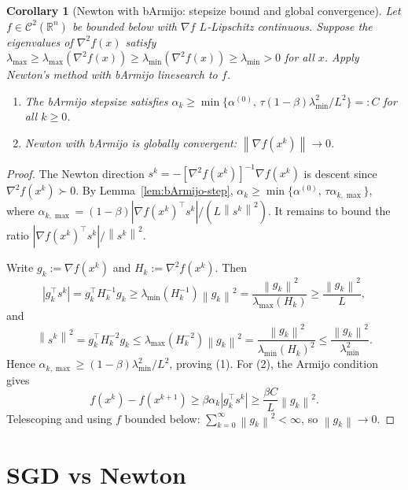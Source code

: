 \documentclass[11pt,a4paper]{report}
\theoremstyle{plain}
\newtheorem{corollary}[theorem]{Corollary}
\theoremstyle{definition}
\newcommand{\R}{\mathbb{R}}
\newcommand{\norm}[1]{\left\lVert#1\right\rVert}
\newcommand{\grad}{\nabla}
\newcommand{\hess}{\nabla^{2}}
\newcommand{\trans}{^{\top}}
\begin{document}
\begin{corollary}[Newton with bArmijo: stepsize bound and global convergence]\label{cor:newton-global}
Let $f\in\mathcal{C}^{2}(\R^{n})$ be bounded below with $\grad f$ $L$-Lipschitz continuous. Suppose the eigenvalues of $\hess f(x)$ satisfy
$\lambda_{\max}\ge\lambda_{\max}(\hess f(x))\ge\lambda_{\min}(\hess f(x))\ge\lambda_{\min}>0$
for all $x$. Apply Newton's method with bArmijo linesearch to $f$.
\begin{enumerate}[leftmargin=2em,itemsep=0pt]
  \item The bArmijo stepsize satisfies
        $\alpha_{k}\ge\min\bigl\{\alpha^{(0)},\,\tau(1-\beta)\lambda_{\min}^{2}/L^{2}\bigr\}=:C$
        for all $k\ge 0$.
  \item Newton with bArmijo is globally convergent:
        $\norm{\grad f(x^{k})}\to 0$.
\end{enumerate}
\end{corollary}
\begin{proof}
The Newton direction $s^{k}=-[\hess f(x^{k})]^{-1}\grad f(x^{k})$ is descent since
$\hess f(x^{k})\succ 0$. By Lemma~\ref{lem:bArmijo-step},
$\alpha_{k}\ge\min\{\alpha^{(0)},\,\tau\alpha_{k,\max}\}$, where
$\alpha_{k,\max}=(1-\beta)|\grad f(x^{k})\trans s^{k}|/(L\norm{s^{k}}^{2})$.
It remains to bound the ratio $|\grad f(x^{k})\trans s^{k}|/\norm{s^{k}}^{2}$.

Write $g_{k}:=\grad f(x^{k})$ and $H_{k}:=\hess f(x^{k})$. Then
\[
|g_{k}\trans s^{k}|=g_{k}\trans H_{k}^{-1}g_{k}
\ge\lambda_{\min}(H_{k}^{-1})\norm{g_{k}}^{2}
=\frac{\norm{g_{k}}^{2}}{\lambda_{\max}(H_{k})}
\ge\frac{\norm{g_{k}}^{2}}{L},
\]
and
\[
\norm{s^{k}}^{2}=g_{k}\trans H_{k}^{-2}g_{k}
\le\lambda_{\max}(H_{k}^{-2})\norm{g_{k}}^{2}
=\frac{\norm{g_{k}}^{2}}{\lambda_{\min}(H_{k})^{2}}
\le\frac{\norm{g_{k}}^{2}}{\lambda_{\min}^{2}}.
\]
Hence
$\alpha_{k,\max}\ge (1-\beta)\lambda_{\min}^{2}/L^{2}$,
proving (1). For (2), the Armijo condition gives
\[
f(x^{k})-f(x^{k+1})\ge\beta\alpha_{k}|g_{k}\trans s^{k}|
\ge\frac{\beta C}{L}\norm{g_{k}}^{2}.
\]
Telescoping and using $f$ bounded below:
$\sum_{k=0}^{\infty}\norm{g_{k}}^{2}<\infty$, so $\norm{g_{k}}\to 0$.
\end{proof}

\newpage

\section{SGD vs Newton}
\end{document}
